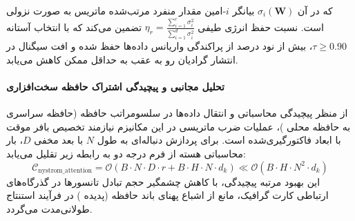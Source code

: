 
که در آن $\sigma_i(\mathbf{W})$ بیانگر $i$-امین مقدار منفرد مرتب‌شده ماتریس به صورت نزولی است. نسبت حفظ انرژی طیفی $\eta_r = \frac{\sum_{i=1}^r \sigma_i^2}{\sum_{i=1}^{d} \sigma_i^2}$ تضمین می‌کند که با انتخاب آستانه $\tau \ge 0.90$، بیش از نود درصد از پراکندگی واریانس داده‌ها حفظ شده و افت سیگنال در انتشار گرادیان رو به عقب به حداقل ممکن کاهش می‌یابد.

\paragraph{تحلیل مجانبی و پیچیدگی اشتراک حافظه سخت‌افزاری}
از منظر پیچیدگی محاسباتی و انتقال داده‌ها در سلسومراتب حافظه (حافظه سراسری  به حافظه محلی )، عملیات ضرب ماتریسی در این مکانیزم نیازمند تخصیص بافر موقت با ابعاد فاکتورگیری‌شده است. برای پردازش دنباله‌ای به طول $N$ با بعد مخفی $D$، بار محاسباتی هسته از فرم درجه دو به رابطه زیر تقلیل می‌یابد:
\begin{equation}
\label{eq:complexity_nystrom_attention}
\mathcal{C}_{\text{nystrom\_attention}} = \mathcal{O}\left( B \cdot N \cdot D \cdot r + B \cdot H \cdot N \cdot d_k \right) \ll \mathcal{O}\left( B \cdot H \cdot N^2 \cdot d_k \right)
\end{equation}
این بهبود مرتبه پیچیدگی، با کاهش چشمگیر حجم تبادل تانسورها در گذرگاه‌های ارتباطی کارت گرافیک، مانع از اشباع پهنای باند حافظه (پدیده ) در فرآیند استنتاج طولانی‌مدت می‌گردد.
